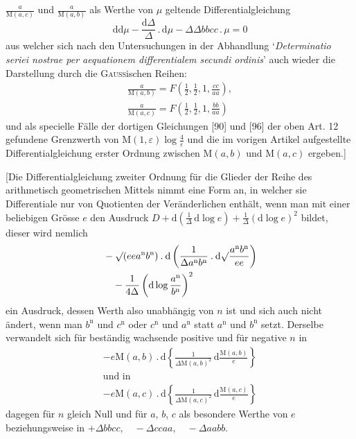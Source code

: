 $\frac{a}{\mathrm M(a,c)}$ und $\frac{a}{\mathrm M(a,b)}$ als Werthe von $\mu$
geltende Differentialgleichung
\[
\mathrm{dd}\mu-\frac{\mathrm d\Delta}{\Delta}\mathbin{.}\mathrm d\mu
-\Delta\Delta bbcc\mathbin{.}\mu=0
\]
aus welcher sich nach den Untersuchungen in der Abhandlung
`\textit{Determinatio seriei nostrae per aequationem differentialem secundi ordinis}'
auch wieder die Darstellung durch die \textsc{Gauss}ischen Reihen:
\[
\begin{gathered}\frac{a}{\mathrm M(a,b)}=F\left(\frac12,\frac12,1,\frac{cc}{aa}\right),\\[7pt]
\frac{a}{\mathrm M(a,c)}=F\left(\frac12,\frac12,1,\frac{bb}{aa}\right)\end{gathered}
\]
und als specielle Fälle der dortigen Gleichungen [90] und [96] der oben Art. 12
gefundene Grenzwerth von $\mathrm M(1,\varepsilon)\log\frac{4}{\varepsilon}$ und die
im vorigen Artikel aufgestellte Differentialgleichung erster Ordnung zwischen
$\mathrm M(a,b)$ und $\mathrm M(a,c)$ ergeben.]

[Die Differentialgleichung zweiter Ordnung für die Glieder der Reihe des
arithmetisch geometrischen Mittels nimmt eine Form an, in welcher sie
Differentiale nur von Quotienten der Veränderlichen enthält, wenn man mit einer
beliebigen Grösse $e$ den Ausdruck
$D+\mathrm d(\frac{1}{\Delta}\,\allowbreak \mathrm d\log e)+\frac{1}{\Delta}(\mathrm d\log e)^2$
bildet, dieser wird nemlich
\[
\begin{aligned}&-\surd(eea^{\mathrm n}b^{\mathrm n})\mathbin{.}\mathrm d
\left(\frac{1}{\Delta a^{\mathrm n}b^{\mathrm n}}\mathbin{.}\mathrm d
\surd\frac{a^{\mathrm n}b^{\mathrm n}}{ee}\right)\\&\quad-\frac{1}{4\Delta}\left(\mathrm d\log\frac{a^{\mathrm n}}{b^{\mathrm n}}\right)^2\end{aligned}
\]
ein Ausdruck, dessen Werth also unabhängig von $n$ ist und sich auch nicht
ändert, wenn man $b^{\mathrm n}$ und $c^{\mathrm n}$ oder $c^{\mathrm n}$ und
$a^{\mathrm n}$ statt $a^{\mathrm n}$ und $b^{\mathrm n}$ setzt. Derselbe verwandelt
sich für beständig wachsende positive und für negative $n$ in
\[
\begin{gathered}-e\mathrm M(a,b)\mathbin{.}\mathrm d
\left\{\frac{1}{\Delta\mathrm M(a,b)^2}\,\mathrm d\frac{\mathrm M(a,b)}{e}\right\}
\\[7pt]\mbox{und in}\\[7pt]
-e\mathrm M(a,c)\mathbin{.}\mathrm d
\left\{\frac{1}{\Delta\mathrm M(a,c)^2}\,\mathrm d\frac{\mathrm M(a,c)}{e}\right\}\end{gathered}
\]
dagegen für $n$ gleich Null und für $a$, $b$, $c$ als besondere Werthe von $e$
beziehungsweise in $+\Delta bbcc,\quad-\Delta ccaa,\quad-\Delta aabb.$

